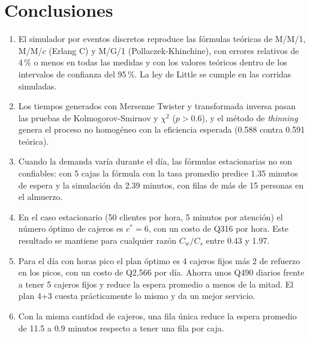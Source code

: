 \documentclass[11pt,letterpaper]{article}
\begin{document}
\section{Conclusiones}
\begin{enumerate}
  \item El simulador por eventos discretos reproduce las fórmulas teóricas de M/M/1,
        M/M/$c$ (Erlang C) y M/G/1 (Pollaczek-Khinchine), con errores relativos de 4\,\% o
        menos en todas las medidas y con los valores teóricos dentro de los intervalos de
        confianza del 95\,\%. La ley de Little se cumple en las corridas simuladas.
  \item Los tiempos generados con Mersenne Twister y transformada inversa pasan las
        pruebas de Kolmogorov-Smirnov y $\chi^2$ ($p > 0.6$), y el método de
        \emph{thinning} genera el proceso no homogéneo con la eficiencia esperada (0.588
        contra 0.591 teórica).
  \item Cuando la demanda varía durante el día, las fórmulas estacionarias no son
        confiables: con 5 cajas la fórmula con la tasa promedio predice 1.35 minutos de
        espera y la simulación da 2.39 minutos, con filas de más de 15 personas en el
        almuerzo.
  \item En el caso estacionario (50 clientes por hora, 5 minutos por atención) el número
        óptimo de cajeros es $c^* = 6$, con un costo de Q316 por hora. Este resultado se
        mantiene para cualquier razón $C_w/C_s$ entre 0.43 y 1.97.
  \item Para el día con horas pico el plan óptimo es 4 cajeros fijos más 2 de refuerzo
        en los picos, con un costo de Q2,566 por día. Ahorra unos Q490 diarios frente a
        tener 5 cajeros fijos y reduce la espera promedio a menos de la mitad. El plan 4+3
        cuesta prácticamente lo mismo y da un mejor servicio.
  \item Con la misma cantidad de cajeros, una fila única reduce la espera promedio de
        11.5 a 0.9 minutos respecto a tener una fila por caja.
\end{enumerate}

\end{document}

